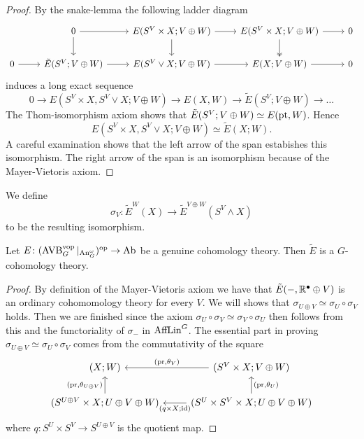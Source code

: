 \begin{proof}
By the snake-lemma the following ladder diagram 
    \[\begin{tikzcd}
        & 0 & {E(S^V\times X;V\oplus W)} & {E(S^V\times X;V\oplus W)} & 0 \\
        0 & {\tilde E(S^V;V\oplus W)} & {E(S^V\vee X;V\oplus W)} & {E(X;V\oplus W)} & 0
        \arrow[from=2-2, to=2-3]
        \arrow[from=2-3, to=2-4]
        \arrow[from=2-4, to=2-5]
        \arrow[from=2-1, to=2-2]
        \arrow[from=1-3, to=2-3]
        \arrow[from=1-2, to=1-3]
        \arrow[from=1-2, to=2-2]
        \arrow[from=1-3, to=1-4]
        \arrow[from=1-4, to=1-5]
        \arrow[two heads, from=1-4, to=2-4]
    \end{tikzcd}\]
induces a long exact sequence
\[
0 \to E(S^V \times X, S^V \vee X; V \oplus W) \to E(X, W) \to \tilde E(S^V; V \oplus W) \to \dots 
\]
The Thom-isomorphism axiom shows that $\tilde E(S^V; V\oplus W) \simeq E(\mathrm{pt}, W)$. 
Hence \[E(S^V \times X, S^V \vee X; V \oplus W) \simeq \tilde E(X;W).\]
A careful examination shows that the left arrow of the span estabishes this isomorphism. The right arrow of the span 
is an isomorphism because of the Mayer-Vietoris axiom.
\end{proof}
\begin{definition}
    We define 
    \[
    \sigma_V \colon \tilde  E^W(X) \to \tilde E^{V\oplus W}(S^V \wedge X)    
    \]
    to be the resulting isomorphism.
\end{definition}

\begin{lemma}
    Let $E \colon (\operatorname{AVB}^{\mathrm{vop}}_G|_{\operatorname{An}_G^\omega})^{\mathrm{op}} \to \mathrm{Ab}$ be a genuine cohomology theory.
    Then $\tilde E$ is a $G$-cohomology theory.
\end{lemma}
\begin{proof}
    By definition of the Mayer-Vietoris axiom we have that $\tilde E(-, \mathbb{R}^\bullet \oplus V)$ is an ordinary cohomomology theory 
    for every $V$.
    We will shows that $\sigma_{U\oplus V} \simeq \sigma_U \circ \sigma_V$ holds. Then we are finished since the axiom 
    $\sigma_U \circ \sigma_V \simeq \sigma_V \circ \sigma_U$ then follows from this and the functoriality of 
    $\sigma_{-}$ in $\operatorname{AffLin}^G$.
    The essential part in proving $\sigma_{U\oplus V} \simeq \sigma_U \circ \sigma_V$  comes from the commutativity of the square 
    \[\begin{tikzcd}
        {(X;W)} & {(S^V\times X;V \oplus W)} \\
        {(S^{U\oplus V}\times X;U\oplus V\oplus W)} & {(S^U\times S^V \times X;U\oplus V\oplus W)}
        \arrow["{(\pr,\theta_V)}"', from=1-2, to=1-1]
        \arrow["{(\pr,\theta_{U\oplus V})}", from=2-1, to=1-1]
        \arrow["{(q\times X;\id)}", from=2-2, to=2-1]
        \arrow["{(\pr,\theta_U)}"', from=2-2, to=1-2]
    \end{tikzcd}\]
    where $q\colon S^U \times S^V \to S^{U\oplus V}$ is the quotient map.
\end{proof}


